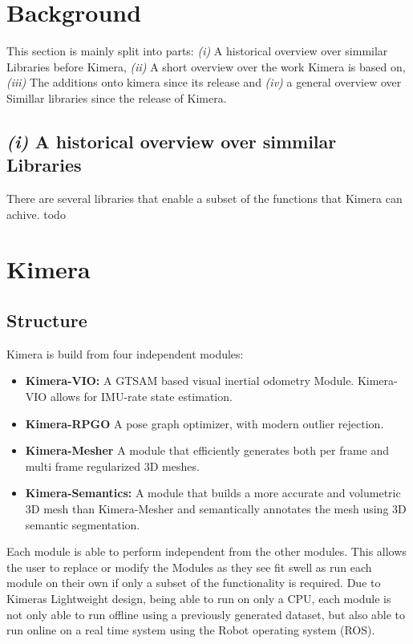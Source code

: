 \documentclass[11pt,a4paper]{article}
\begin{document}
\section{Background} \label{Sec:background}
This section is mainly split into parts: \emph{(i)} A historical overview over simmilar Libraries before Kimera, \emph{(ii)} A short overview over the work Kimera is based on, \emph{(iii)} The additions onto kimera since its release and \emph{(iv)} a general overview over Simillar libraries since the release of Kimera.
\subsection*{\emph{(i)} A historical overview over simmilar Libraries}
There are several libraries that enable a subset of the functions that Kimera can achive. 
todo
 
\section{Kimera} \label{Sec:kimera}
\subsection{Structure}
Kimera is build from four independent modules: 
\begin{itemize}
    \item \textbf{Kimera-VIO:} A GTSAM \cite{gtsam} based visual inertial odometry Module. Kimera-VIO allows for IMU-rate state estimation. 
    \item \textbf{Kimera-RPGO} A pose graph optimizer, with modern outlier rejection.
    \item \textbf{Kimera-Mesher} A module that efficiently generates both per frame and multi frame regularized 3D meshes. 
    \item \textbf{Kimera-Semantics:} A module that builds a more accurate and volumetric 3D mesh than Kimera-Mesher and semantically annotates the mesh using 3D semantic segmentation. 
\end{itemize}
Each module is able to perform independent from the other modules. 
This allows the user to replace or modify the Modules as they see fit swell as run each module on their own if only a subset of the functionality is required.
Due to Kimeras Lightweight design, being able to run on only a CPU, each module is not only able to run  offline using a previously generated dataset, but also able to run online on a real time system using the Robot operating system (ROS).
\end{document}
